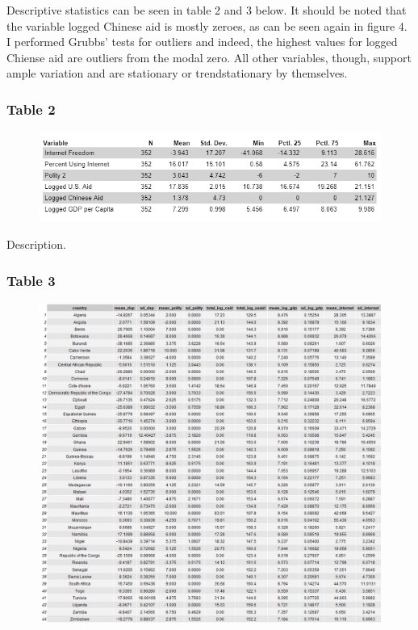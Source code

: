 \documentclass[12pt]{article}
\begin{document}
Descriptive statistics can be seen in table 2 and 3 below. It should be noted that the variable logged Chinese aid is mostly zeroes, as can be seen again in figure 4. I performed Grubbs' tests for outliers and indeed, the highest values for logged Chiense aid are outliers from the modal zero. All other variables, though, support ample variation and are stationary or trendstationary by themselves. 

\subsubsection*{Table 2}
\begin{figure}[htbp]
    \includegraphics[scale=0.8]{Figures/628table2.png}
\end{figure}
\pagebreak

Description.
\subsubsection*{Table 3}
\begin{figure}[htbp]
    \includegraphics[scale=0.45]{Figures/summary.png}
\end{figure}
\end{document}
